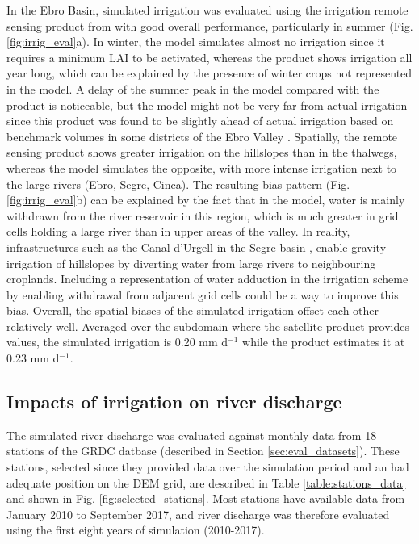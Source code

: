 In the Ebro Basin, simulated irrigation was evaluated using the irrigation remote sensing product from \cite{dari_regional_2023} with good overall performance, particularly in summer (Fig. \ref{fig:irrig_eval}a).
In winter, the model simulates almost no irrigation since it requires a minimum LAI to be activated, whereas the product shows irrigation all year long, which can be explained by the presence of winter crops not represented in the model.
A delay of the summer peak in the model compared with the product is noticeable, but the model might not be very far from actual irrigation since this product was found to be slightly ahead of actual irrigation based on benchmark volumes in some districts of the Ebro Valley \citep[Fig. 5 in ][]{dari_regional_2023}.
Spatially, the remote sensing product shows greater irrigation on the hillslopes than in the thalwegs, whereas the model simulates the opposite, with more intense irrigation next to the large rivers (Ebro, Segre, Cinca).
The resulting bias pattern (Fig. \ref{fig:irrig_eval}b) can be explained by the fact that in the model, water is mainly withdrawn from the river reservoir in this region, which is much greater in grid cells holding a large river than in upper areas of the valley. In reality, infrastructures such as the Canal d'Urgell in the Segre basin \citep{farran_urgell_2024}, enable gravity irrigation of hillslopes by diverting water from large rivers to neighbouring croplands. Including a representation of water adduction in the irrigation scheme by enabling withdrawal from adjacent grid cells could be a way to improve this bias.
Overall, the spatial biases of the simulated irrigation offset each other relatively well. Averaged over the subdomain where the satellite product provides values, the simulated irrigation is 0.20 mm d$^{-1}$ while the product estimates it at 0.23 mm d$^{-1}$.

\subsection{Impacts of irrigation on river discharge}

The simulated river discharge was evaluated against monthly data from 18 stations of the GRDC datbase (described in Section \ref{sec:eval_datasets}).
These stations, selected since they provided data over the simulation period and an had adequate position on the DEM grid, are described in Table \ref{table:stations_data} and shown in Fig. \ref{fig:selected_stations}. Most stations have available data from January 2010 to September 2017, and river discharge was therefore evaluated using the first eight years of simulation (2010-2017).

